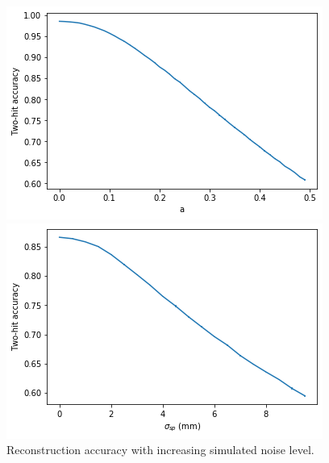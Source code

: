 \begin{figure}
    \centering
    \begin{minipage}{0.49\textwidth} \centering
        \includegraphics[width=\textwidth]{graphs/pi_enNoise_acc.png}
        \end{minipage}
        \begin{minipage}{0.49\textwidth} \centering
        \includegraphics[width=\textwidth]{graphs/pi_spNoise_acc.png}
        \end{minipage}
        \caption{Reconstruction accuracy with increasing simulated noise level.}
        \label{fig:sim_acc}
\end{figure}